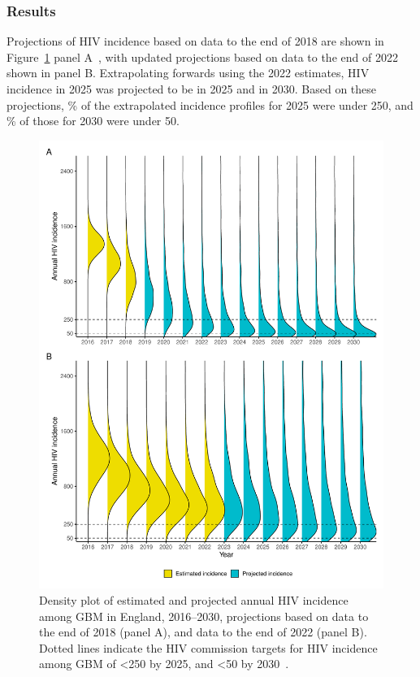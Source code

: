 \subsubsection{Results}

Projections of HIV incidence based on data to the end of 2018 are shown in Figure~\ref{fig:projected_incidence} panel A~\parencite{Brizzi2021-zl}, with updated projections based on data to the end of 2022 shown in panel B. Extrapolating forwards using the 2022 estimates, HIV incidence in 2025 was projected to be  in 2025 and  in 2030\@. Based on these projections, \% of the extrapolated incidence profiles for 2025 were under 250, and \% of those for 2030 were under 50.

\begin{figure}[htbp!]
  \centering
  \includegraphics[width=\textwidth]{projected_incidence.pdf}
  \caption[Density plot of estimated and projected annual HIV incidence among GBM in England, 2016--2030]{Density plot of estimated and projected annual HIV incidence among GBM in England, 2016--2030, projections based on data to the end of 2018 (panel A), and data to the end of 2022 (panel B). Dotted lines indicate the HIV commission targets for HIV incidence among GBM of <250 by 2025, and <50 by 2030~\parencite{HIV_Commission2020-yy}.}\label{fig:projected_incidence}
\end{figure}

